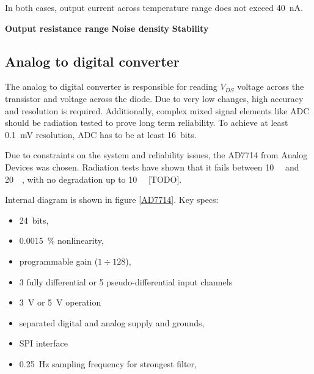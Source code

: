         In both cases, output current across temperature range does not exceed \SI{40}{\nano\ampere}.

        \bigskip\textbf{Output resistance range}
        \bigskip\textbf{Noise density}
        \bigskip\textbf{Stability}

    \subsection{Analog to digital converter}
        The analog to digital converter is responsible for reading $V_{DS}$ voltage across the transistor and voltage across the diode. Due to very low changes, high accuracy and resolution is required. Additionally, complex mixed signal elements like ADC should be radiation tested to prove long term reliability. To achieve at least \SI{0.1}{\milli\volt} resolution, ADC has to be at least \SI{16}{bits}.

        Due to constraints on the system and reliability issues, the AD7714 from Analog Devices was chosen. Radiation tests have shown that it fails between \SI{10}{\kilo\rad} and \SI{20}{\kilo\rad}, with no degradation up to \SI{10}{\kilo\rad} [TODO].

        Internal diagram is shown in figure \ref{AD7714}. Key specs:
        \begin{itemize}
            \item \SI{24}{bits},
            \item \SI{0.0015}{\percent} nonlinearity,
            \item programmable gain ($1 \div 128$),
            \item 3 fully differential or 5 pseudo-differential input channels
            \item \SI{3}{\volt} or \SI{5}{\volt} operation
            \item separated digital and analog supply and grounds,
            \item SPI interface
            \item \SI{0.25}{\hertz} sampling frequency for strongest filter,
        \end{itemize}

